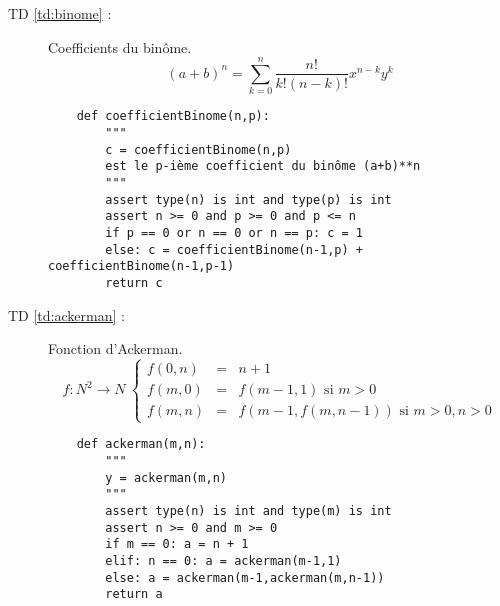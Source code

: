 \begin{description}
\item[TD \ref{td:binome} :]Coefficients du binôme.
	$$(a+b)^n = \sum_{k=0}^n \frac{n!}{k!(n-k)!}x^{n-k}y^k$$
	
	\begin{py}{14cm}
	\begin{verbatim}
	def coefficientBinome(n,p):
	    """
	    c = coefficientBinome(n,p)
	    est le p-ième coefficient du binôme (a+b)**n
	    """
	    assert type(n) is int and type(p) is int
	    assert n >= 0 and p >= 0 and p <= n
	    if p == 0 or n == 0 or n == p: c = 1
	    else: c = coefficientBinome(n-1,p) + coefficientBinome(n-1,p-1)
	    return c
	\end{verbatim}
	\end{py}

\item[TD \ref{td:ackerman} :] Fonction d'Ackerman.
	$$
	{f : N^2 \rightarrow N}\ 
	\left\{\begin{array}{lll}
	f{(0,n)} & = & n+1\\
	f{(m,0)} & = & f{(m-1,1)}\mbox{\ si\ } m > 0\\
	f{(m,n)} & = & f{(m-1,f{(m,n-1)})}\mbox{\ si\ } m > 0, n > 0
	\end{array}\right.
	$$

	\begin{py}{14cm}
	\begin{verbatim}
	def ackerman(m,n):
	    """
	    y = ackerman(m,n)
	    """
	    assert type(n) is int and type(m) is int
	    assert n >= 0 and m >= 0
	    if m == 0: a = n + 1
	    elif: n == 0: a = ackerman(m-1,1)
	    else: a = ackerman(m-1,ackerman(m,n-1))
	    return a
	\end{verbatim}
	\end{py}
\end{description}

